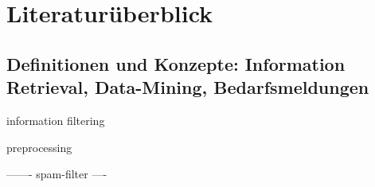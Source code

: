 \chapter{Literaturüberblick}
\label{chap:literaturüberblick}

\section{Definitionen und Konzepte: Information Retrieval, Data-Mining, Bedarfsmeldungen}
\label{sec:definitionen-konzepte}



\cite{horesh2016information}

\cite{kobayashi2000information}

\cite{singhal2001modern}

\cite{croft2000combining}

\cite{belkin1992information}

information filtering
\cite{lanquillon2001enhancing}

preprocessing
\cite{alasadi2017review}

-------
spam-filter
\cite{shafi2017review}
\cite{khorsi2007overview}
\cite{tretyakov2004machine}
----

\newpage





